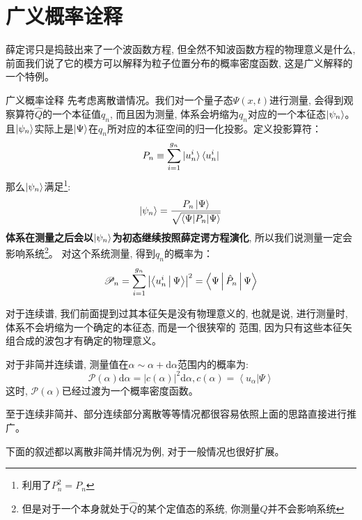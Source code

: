 \documentclass[a4paper,zihao=-4,linespread=1]{ctexrep}
\begin{document}
    \section{广义概率诠释}
    薛定谔只是捣鼓出来了一个波函数方程, 但全然不知波函数方程的物理意义是什么, 前面我们说了它的模方可以解释为粒子位置分布的概率密度函数, 这是广义解释的一个特例。
    \begin{proposition}{广义概率诠释}
        \setlength\parindent{2em}先考虑离散谱情况。我们对一个量子态$\Psi(x,t)$进行测量, 会得到观察算符$\hat{Q}$的一个本征值$q_n$, 而且因为测量, 体系会坍缩为$q_n$对应的一个本征态$\ket{\psi_n}$。
        且$\ket{\psi_n}$实际上是$\ket{\Psi}$在$q_n$所对应的本征空间的归一化投影。定义投影算符：
        \[P_n\equiv\sum\limits_{i=1}^{g_n} \ket{u_n^i} \bra{u_n^i}\]
        那么$\ket{\psi_n}$满足\footnote{利用了$P_n^2=P_n$}:
        \begin{equation}
            \ket{\psi_n}=\frac{P_n\ket{\Psi}}{\sqrt{\braket{\Psi|P_n|\Psi}}}
        \end{equation}
        \textbf{体系在测量之后会以$\ket{\psi_n}$为初态继续按照薛定谔方程演化}, 所以我们说测量一定会影响系统\footnote{但是对于一个本身就处于$\hat Q$的某个定值态的系统, 你测量$Q$并不会影响系统}。
        对这个系统测量, 得到$q_n$的概率为：
        \begin{equation}
        	\label{eq:3.13}
            \mathscr{P}_n=\sum\limits_{i=1}^{g_n}\left|\Braket{u_n^i|\Psi}\right|^2=\Braket{\Psi|\hat{P}_n|\Psi}
        \end{equation}
            
        
        \setlength\parindent{2em}对于连续谱, 我们前面提到过其本征矢是没有物理意义的, 也就是说, 进行测量时, 体系不会坍缩为一个确定的本征态, 而是一个很狭窄的
        范围, 因为只有这些本征矢组合成的波包才有确定的物理意义。

        \setlength\parindent{2em}对于非简并连续谱, 测量值在$\alpha\sim\alpha+\mathrm{d}\alpha$范围内的概率为:
        \begin{equation}
            \mathscr{P}(\alpha)\mathrm{d}\alpha=\left|c(\alpha)\right|^2\mathrm{d}\alpha,c(\alpha)=\left \langle u_\alpha  | \Psi  \right \rangle 
        \end{equation}
        这时, $\mathscr{P}(\alpha)$已经过渡为一个概率密度函数。

        \setlength\parindent{2em}至于连续非简并、部分连续部分离散等等情况都很容易依照上面的思路直接进行推广。
    \end{proposition}
    下面的叙述都以离散非简并情况为例, 对于一般情况也很好扩展。
\end{document}
